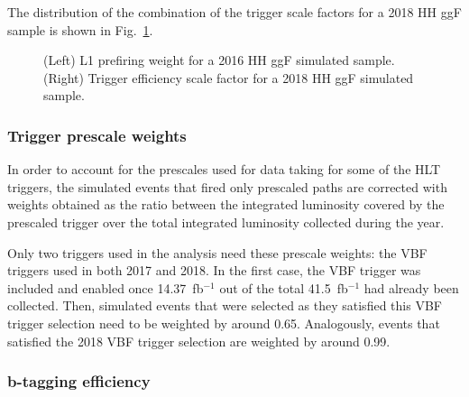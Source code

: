 \documentclass[../main.tex]{subfiles}
\begin{document}
The distribution of the combination of the trigger scale factors for a 2018 HH ggF sample is shown in Fig.~\ref{hh:fig:sf_l1pref_trig}.


\begin{figure}[h!]
\begin{center}
\end{center}
\caption[L1 prefiring and trigger scale factors]{(Left) L1 prefiring weight for a 2016 HH ggF simulated sample. (Right) Trigger efficiency scale factor for a 2018 HH ggF simulated sample.}
\label{hh:fig:sf_l1pref_trig}
\end{figure}



\subsubsection*{Trigger prescale weights}
\label{hh:sec:prescale_sf}

In order to account for the prescales used for data taking for some of the HLT triggers, the simulated events that fired only prescaled paths are corrected with weights obtained as the ratio between the integrated luminosity covered by the prescaled trigger over the total integrated luminosity collected during the year.

Only two triggers used in the analysis need these prescale weights: the VBF triggers used in both 2017 and 2018. In the first case, the VBF trigger was included and enabled once 14.37~fb$^{-1}$ out of the total 41.5~fb$^{-1}$ had already been collected. Then, simulated events that were selected as they satisfied this VBF trigger selection need to be weighted by around 0.65. Analogously, events that satisfied the 2018 VBF trigger selection are weighted by around 0.99.

\subsubsection*{b-tagging efficiency}
\end{document}
